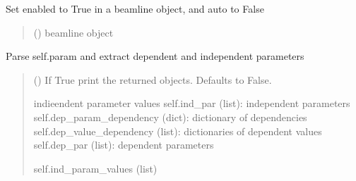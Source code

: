 \documentclass[letterpaper,10pt,english]{sphinxmanual}
\begin{document}
\begin{fulllineitems}
\begin{fulllineitems}
\label{\detokenize{index:raypyng.simulate.SimulationParams._enable_param}}
\pysigstartsignatures
{}
\pysigstopsignatures
\sphinxAtStartPar
Set enabled to True in a beamline object, and auto to False
\begin{quote}\begin{description}
\sphinxAtStartPar
{} () \textendash{} beamline object

\end{description}\end{quote}

\end{fulllineitems}


\begin{fulllineitems}
\label{\detokenize{index:raypyng.simulate.SimulationParams._extract_param}}
\pysigstartsignatures
{}
\pysigstopsignatures
\sphinxAtStartPar
Parse self.param and extract dependent and independent parameters
\begin{quote}\begin{description}
\sphinxAtStartPar
{} (\sphinxstyleliteralemphasis{\sphinxupquote{, }}) \textendash{} If True print the returned objects. Defaults to False.

\sphinxAtStartPar
indieendent parameter values
self.ind\_par (list): independent parameters
self.dep\_param\_dependency (dict): dictionary of dependencies
self.dep\_value\_dependency (list): dictionaries of dependent values
self.dep\_par (list): dependent parameters

\sphinxAtStartPar
self.ind\_param\_values (list)

\end{description}\end{quote}


\end{fulllineitems}
\end{fulllineitems}
\end{document}
